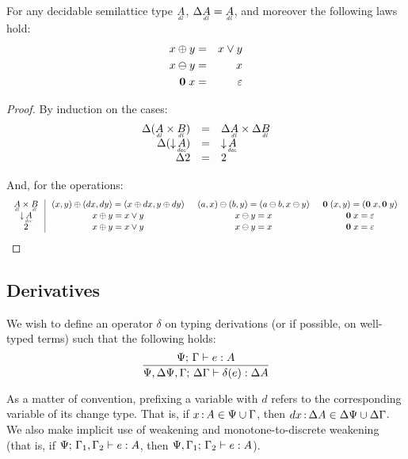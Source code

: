 \documentclass{article}
\begin{document}
\begin{lemma}
  For any decidable semilattice type $\eqlat{A}$, $\GD \eqlat{A} = \eqlat{A}$,
  and moreover the following laws hold:
  \begin{eqnarray*}
    x \oplus y &=& x \vee y\\
    x \ominus y &=& x\\
    \mathbf{0}\; x &=& \varepsilon
  \end{eqnarray*}
\end{lemma}
\begin{proof}
  By induction on the cases:
  \[\begin{array}{rcl}
    \GD(\eqlat{A} \x \eqlat{B}) &=& \GD \eqlat{A} \x \GD \eqlat{B}\\
    \GD(\Down{\eq{A}}) &=& \Down{\eq{A}}\\
    \GD \tbool &=& \tbool
  \end{array}\]

  And, for the operations:
  \[\arraycolsep=0.75em
  \begin{array}{c|ccc}
    \eqlat{A} \x \eqlat{B}
    & (x,y) \oplus (dx,dy) = (x \oplus dx, y \oplus dy)
    & (a,x) \ominus (b,y) = (a \ominus b, x \ominus y)
    & \mb{0}\; (x,y) = (\mb{0}\; x, \mb{0}\; y)\\
    \Down{\eq{A}}
    & x \oplus y = x \vee y
    & x \ominus y = x
    & \mb{0}\;x = \unit\\
    \tbool
    & x \oplus y = x \vee y
    & x \ominus y = x
    & \mb{0}\;x = \unit\\
  \end{array}
  \]
\end{proof}


\subsection{Derivatives}

We wish to define an operator $\delta$ on typing derivations (or if possible, on
well-typed terms) such that the following holds:
\[\infer{\J{\GP,\GD\GP,\GG}{\GD\GG}{\delta(e)}{\Delta A}}
        {\J{\GP}{\GG}{e}{A}}
\]

As a matter of convention, prefixing a variable with $d$ refers to the
corresponding variable of its change type. That is, if $x \,{:}\, A \in \Psi \cup
\Gamma$, then $dx \,{:}\, \Delta A \in \Delta\Psi \cup \Delta\Gamma$. We also make implicit use of
weakening and monotone-to-discrete weakening (that is, if
${\Psi};\,{\Gamma_1,\Gamma_2}\vdash {e}:{A}$, then ${\Psi,\Gamma_1};\,{\Gamma_2}\vdash {e}:{A}$).
\end{document}
